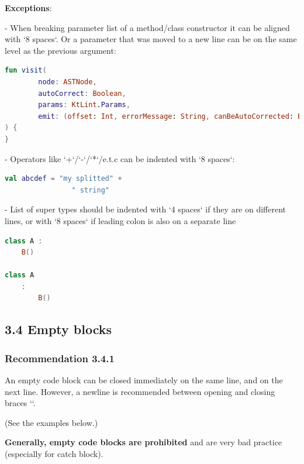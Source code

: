 \textbf{Exceptions}: 

- When breaking parameter list of a method/class constructor it can be aligned with `8 spaces`. Or a parameter that was moved to a new line can be on the same level as the previous argument:

    

\begin{lstlisting}[language=Kotlin]
fun visit(
        node: ASTNode,
        autoCorrect: Boolean,
        params: KtLint.Params,
        emit: (offset: Int, errorMessage: String, canBeAutoCorrected: Boolean) -> Unit
) {   
}
\end{lstlisting}
    

- Operators like `+`/`-`/`*`/e.t.c can be indented with `8 spaces`:

    

\begin{lstlisting}[language=Kotlin]
val abcdef = "my splitted" +
                " string"
\end{lstlisting}
    

- List of super types should be indented with `4 spaces` if they are on different lines, or with `8 spaces` if leading colon is also on a separate line



\begin{lstlisting}[language=Kotlin]
class A :
    B()
    
class A
    :
        B()
\end{lstlisting}


\subsection*{\textbf{3.4 Empty blocks}}

\subsubsection*{\textbf{Recommendation 3.4.1}}
\leavevmode\newline



An empty code block can be closed immediately on the same line, and on the next line. However, a newline is recommended between opening and closing braces `{}`.

(See the examples below.)



\textbf{Generally, empty code blocks are prohibited} and are very bad practice (especially for catch block).

